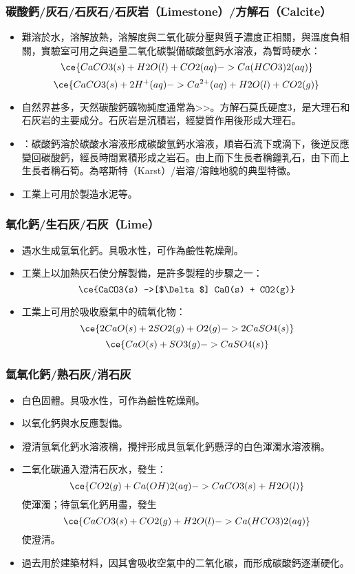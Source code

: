 \documentclass[a4paper,12pt]{report}
\begin{document}
\begin{itemize}
\begin{itemize}
\subsubsection{碳酸鈣/灰石/石灰石/石灰岩（Limestone）/方解石（Calcite）}
\begin{itemize}
\item 難溶於水，溶解放熱，溶解度與二氧化碳分壓與質子濃度正相關，與溫度負相關，實驗室可用之與過量二氧化碳製備碳酸氫鈣水溶液，為暫時硬水：
\[\ce{CaCO3(s) + H2O(l) + CO2(aq) -> Ca(HCO3)2(aq)}\]
\[\ce{CaCO3(s) + 2H^+(aq) -> Ca^{2+}(aq) + H2O(l) + CO2(g)}\]
\item 自然界甚多，天然碳酸鈣礦物純度通常為>>。方解石莫氏硬度3，是大理石和石灰岩的主要成分。石灰岩是沉積岩，經變質作用後形成大理石。
\item {}：碳酸鈣溶於碳酸水溶液形成碳酸氫鈣水溶液，順岩石流下或滴下，後逆反應變回碳酸鈣，經長時間累積形成之岩石。由上而下生長者稱鐘乳石，由下而上生長者稱石筍。為喀斯特（Karst）/岩溶/溶蝕地貌的典型特徵。
\item 工業上可用於製造水泥等。
\end{itemize}
\subsubsection{氧化鈣/生石灰/石灰（Lime）}
\begin{itemize}
\item 遇水生成氫氧化鈣。具吸水性，可作為鹼性乾燥劑。
\item 工業上以加熱灰石使分解製備，是許多製程的步驟之一：
\[\ce{CaCO3(s) ->[$\Delta$] CaO(s) + CO2(g)}\]
\item 工業上可用於吸收廢氣中的硫氧化物：
\[\ce{2CaO(s) + 2SO2(g) + O2(g) -> 2CaSO4(s)}\]
\[\ce{CaO(s) + SO3(g) -> CaSO4(s)}\]
\end{itemize}
\subsubsection{氫氧化鈣/熟石灰/消石灰}
\begin{itemize}
\item 白色固體。具吸水性，可作為鹼性乾燥劑。
\item 以氧化鈣與水反應製備。
\item 澄清氫氧化鈣水溶液稱，攪拌形成具氫氧化鈣懸浮的白色渾濁水溶液稱。
\item 二氧化碳通入澄清石灰水，發生：
\[\ce{CO2(g) + Ca(OH)2(aq) -> CaCO3(s) + H2O(l)}\]
使渾濁；待氫氧化鈣用盡，發生
\[\ce{CaCO3(s) + CO2(g) +H2O(l) -> Ca(HCO3)2(aq)}\]
使澄清。
\item 過去用於建築材料，因其會吸收空氣中的二氧化碳，而形成碳酸鈣逐漸硬化。
\end{itemize}

\end{itemize}
\end{itemize}
\end{document}
